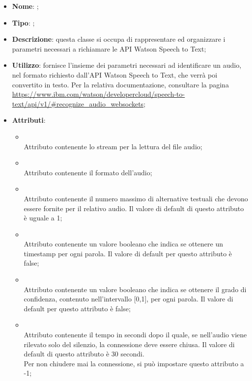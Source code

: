 \begin{itemize}
	\item \textbf{Nome}: ;
	\item \textbf{Tipo}: ;
	\item \textbf{Descrizione}: questa classe si occupa di rappresentare ed organizzare i parametri necessari a richiamare le API Watson Speech to Text;
	\item \textbf{Utilizzo}: fornisce l'insieme dei parametri necessari ad identificare un audio, nel formato richiesto dall'API Watson Speech to Text, che verrà poi convertito in testo.
Per la relativa documentazione, consultare la pagina \url{https://www.ibm.com/watson/developercloud/speech-to-text/api/v1/#recognize_audio_websockets};
	\item \textbf{Attributi}:
	\begin{itemize}
		\item[]  \\
		Attributo contenente lo stream per la lettura del file audio;
		\item[]  \\
		Attributo contenente il formato dell'audio;
		\item[]  \\
		Attributo contenente il numero massimo di alternative testuali che devono essere fornite per il relativo audio. Il valore di default di questo attributo è uguale a 1;
		\item[]  \\
		Attributo contenente un valore booleano che indica se ottenere un timestamp per ogni parola. Il valore di default per questo attributo è false;
		\item[]  \\
		Attributo contenente un valore booleano che indica se ottenere il grado di confidenza, contenuto nell'intervallo [0,1], per ogni parola. Il valore di default per questo attributo è false;
		\item[]  \\
		Attributo contenente il tempo in secondi dopo il quale, se nell'audio viene rilevato solo del silenzio, la connessione deve essere chiusa. Il valore di default di questo attributo è 30 secondi. \\
Per non chiudere mai la connessione, si può impostare questo attributo a -1;

\end{itemize}
\end{itemize}
